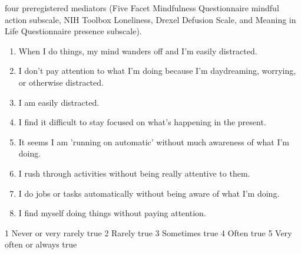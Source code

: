 \documentclass[aspectratio=169]{beamer}
\theoremstyle{remark}
\begin{document}
\begin{frame}
    four preregistered mediators (Five Facet Mindfulness Questionnaire mindful action subscale, NIH Toolbox Loneliness, Drexel Defusion Scale, and Meaning in Life Questionnaire presence subscale).

    \begin{enumerate}
        \item When I do things, my mind wanders off and I'm easily distracted.
        \item I don't pay attention to what I'm doing because I'm daydreaming, worrying, or otherwise distracted.
        \item I am easily distracted.
        \item I find it difficult to stay focused on what's happening in the present.
        \item It seems I am 'running on automatic' without much awareness of what I'm doing.
        \item I rush through activities without being really attentive to them.
        \item I do jobs or tasks automatically without being aware of what I'm doing.
        \item I find myself doing things without paying attention.
    \end{enumerate}

    1 Never or very rarely true
    2 Rarely true
    3 Sometimes true
    4 Often true
    5 Very often or always true
\end{frame}
\end{document}
